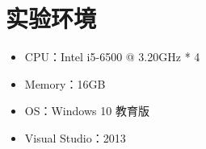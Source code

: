 \section {实验环境}
\begin{itemize}[noitemsep]
    \item CPU：Intel i5-6500 @ 3.20GHz * 4
    \item Memory：16GB
    \item OS：Windows 10 教育版
    \item Visual Studio：2013
\end{itemize}
